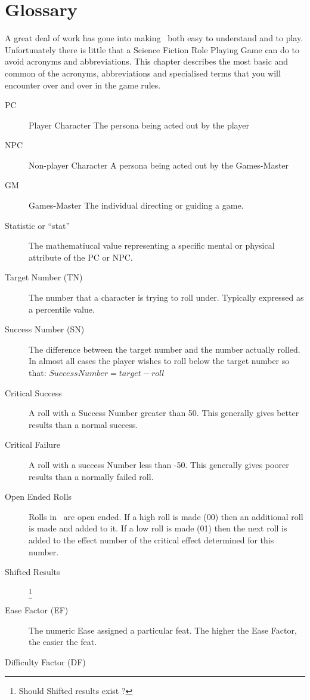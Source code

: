 \chapter{Glossary}
A great deal of work has gone into making \SH\ both
easy to understand and to play. Unfortunately there is little
that a Science Fiction Role Playing Game can do to avoid
acronyms and abbreviations. This chapter describes the most basic 
and common of the acronyms, abbreviations and specialised 
terms that you will encounter over and over in the game rules. 

\begin{description}
	\item[PC] Player Character 
    The persona being acted out by the player
    \item[NPC] Non-player Character
    A persona being acted out by the Games-Master
    \item[GM] Games-Master
    The individual directing or guiding a game.
    \item[Statistic or ``stat'']
    The mathematiucal value representing a specific mental or 
	physical attribute of the PC or NPC.
	\item[Target Number (TN)] 
	The number that a character is trying to roll under. 
	Typically expressed as a percentile value.
	\item[Success Number (SN)] 
	The difference between the target number and the number actually rolled. In
	almost all cases the player wishes to roll below the target number so that:
	\(Success Number = target - roll\)
    \item[Critical Success]
	A roll with a Success Number greater than 50. This generally gives better results than 
	a normal success.
    \item[Critical Failure]
    A roll with a success Number less than -50. This generally gives poorer 
    results than a normally failed roll.
	\item[Open Ended Rolls]
	Rolls in \SH\ are open ended. If a high roll is made (00)
	then an additional roll is made and added to it. If a low roll is 
	made (01) then the next roll is added to the effect number of the 
	critical effect determined for this number. 
    \item[Shifted Results]\footnote{Should Shifted results exist ?}
	\item[Ease Factor (EF)] 
	The numeric Ease assigned a particular feat. The higher the Ease Factor, the
	easier the feat.
	\item[Difficulty Factor (DF)] 

\end{description}
